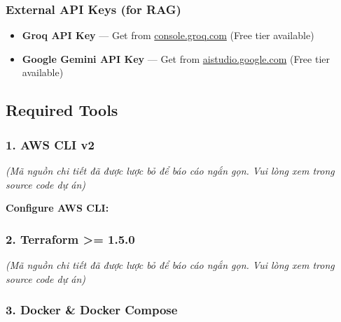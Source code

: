 \hypertarget{external-api-keys-for-rag}{%
\subsubsection{External API Keys (for
RAG)}}

\begin{itemize}
\tightlist
\item
  \textbf{Groq API Key} --- Get from
  \href{https://console.groq.com/}{console.groq.com} (Free tier
  available)
\item
  \textbf{Google Gemini API Key} --- Get from
  \href{https://aistudio.google.com/}{aistudio.google.com} (Free tier
  available)
\end{itemize}

\hypertarget{required-tools}{%
\subsection{Required Tools}}

\hypertarget{aws-cli-v2}{%
\subsubsection{1. AWS CLI v2}}

\emph{(Mã nguồn chi tiết đã được lược bỏ để báo cáo ngắn gọn. Vui lòng
xem trong source code dự án)}

\textbf{Configure AWS CLI:}

\begin{Shaded}
\begin{Highlighting}[]
\end{Highlighting}
\end{Shaded}

\hypertarget{terraform-1.5.0}{%
\subsubsection{2. Terraform \textgreater= 1.5.0}}

\emph{(Mã nguồn chi tiết đã được lược bỏ để báo cáo ngắn gọn. Vui lòng
xem trong source code dự án)}

\hypertarget{docker-docker-compose}{%
\subsubsection{3. Docker \& Docker
Compose}}

